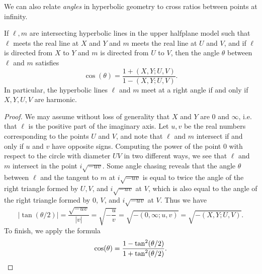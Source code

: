 We can also relate \emph{angles} in hyperbolic geometry to cross ratios between points at infinity.

\begin{thm} If $\ell, m$ are intersecting hyperbolic lines in the upper halfplane model such that $\ell$ meets the real line at $X$ and $Y$ and $m$ meets the real line at $U$ and $V$, and if $\ell$ is directed from $X$ to $Y$ and $m$ is directed from $U$ to $V$, then the angle $\theta$ between $\ell$ and $m$ satisfies
\[
\cos(\theta) = \frac{1+(X,Y;U,V)}{1-(X,Y;U,V)}.
\]
In particular, the hyperbolic lines $\ell$ and $m$ meet at a right angle if and only if $X,Y,U,V$ are harmonic.
\end{thm}
\begin{proof} We may assume without loss of generality that $X$ and $Y$ are $0$ and $\infty$, i.e. that $\ell$ is the positive part of the imaginary axis. Let $u,v$ be the real numbers corresponding to the points $U$ and $V$, and note that $\ell$ and $m$ intersect if and only if $u$ and $v$ have opposite signs. Computing the power of the point $0$ with respect to the circle with diameter $UV$ in two different ways, we see that $\ell$ and $m$ intersect in the point $i\sqrt{-uv}$. Some angle chasing reveals that the angle $\theta$ between $\ell$ and the tangent to $m$ at $i\sqrt{-uv}$ is equal to twice the angle of the right triangle formed by $U, V$, and $i\sqrt{-uv}$ at $V$, which is also equal to the angle of the right triangle formed by $0$, $V$, and $i\sqrt{-uv}$ at $V$. Thus we have
\[
|\tan(\theta/2)| = \frac{\sqrt{-uv}}{|v|} = \sqrt{-\frac{u}{v}} = \sqrt{-(0,\infty;u,v)} = \sqrt{-(X,Y;U,V)}.
\]
To finish, we apply the formula
\[
\cos(\theta) = \frac{1 - \tan^2(\theta/2)}{1 + \tan^2(\theta/2)}.\qedhere
\]
\end{proof}






